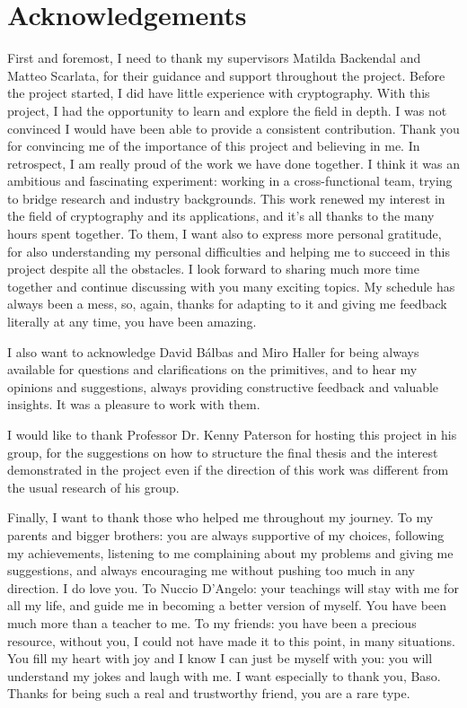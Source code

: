 \chapter*{Acknowledgements}

First and foremost, I need to thank my supervisors Matilda Backendal and Matteo Scarlata,
for their guidance and support throughout the project.
Before the project started, I did have little experience with
cryptography. With this project, I had the opportunity to
learn and explore the field in depth. 
I was not convinced I would have been able to provide
a consistent contribution. 
Thank you for convincing me of the importance of this project
and believing in me.
In retrospect, I am really
proud of the work we have done together.
I think it was an ambitious and fascinating experiment:
working in a cross-functional team, trying to bridge
research and industry backgrounds.
This work renewed my interest in the field of 
cryptography and its applications, and it's all thanks
to the many hours spent together.
To them, I want also to express more personal gratitude,
for also understanding my personal difficulties and
helping me to succeed in this project despite all the obstacles.
I look forward to sharing much more time together and continue
discussing with you many exciting topics.
My schedule has always been a mess,
so, again, thanks for adapting to it and giving me feedback literally
at any time, you have been amazing.

I also want to acknowledge David B{\'a}lbas and Miro Haller for 
being always available for questions and clarifications on the primitives,
and to hear my opinions and suggestions, always providing
constructive feedback and valuable insights. It was a pleasure
to work with them.

I would like to thank Professor Dr. Kenny Paterson
for hosting this project in his group, for the suggestions
on how to structure the final thesis and the interest
demonstrated in the project even if the direction
of this work was different from the usual research of his group.

Finally, I want to thank those who helped me throughout my journey.
To my parents and bigger brothers: you are always supportive of my choices,
following my achievements, listening to me complaining about my problems
and giving me suggestions, 
and always encouraging me without pushing too much in any direction. I do love you.
\newline
To Nuccio D'Angelo: your teachings will stay with me for all my life,
and guide me in becoming a better version of myself. 
You have been much more than a teacher to me. 
\newline
To my friends: you have been a precious resource, without you, 
I could not have made it to this point, in many situations.
You fill my heart with joy and I know I can just be
myself with you: you will understand my jokes and laugh with me.
I want especially to thank you, Baso. Thanks for being such a 
real and trustworthy friend, you are a rare type.
